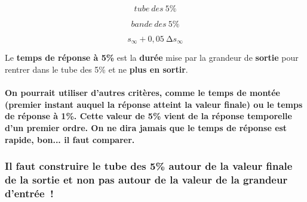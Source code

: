 \[tube\ des\ 5\%\]

\[bande\ des\ 5\%\]

\[s_{\infty} + 0,05\ \mathrm{\Delta}s_{\infty}\]

Le \textbf{temps de réponse à 5\%} est la \textbf{durée} mise par la
grandeur de \textbf{sortie} pour rentrer dans le tube des 5\% et ne
\textbf{plus en sortir}.

\paragraph*{On pourrait utiliser d'autres critères, comme le temps de montée (premier instant auquel la réponse atteint la valeur finale) ou le temps de réponse à 1\%. Cette valeur de 5\% vient de la réponse temporelle d'un premier ordre. On ne dira jamais que le temps de réponse est rapide, bon... il faut comparer. }\label{on-pourrait-utiliser-dautres-crituxe8res-comme-le-temps-de-montuxe9e-premier-instant-auquel-la-ruxe9ponse-atteint-la-valeur-finale-ou-le-temps-de-ruxe9ponse-uxe0-1.-cette-valeur-de-5-vient-de-la-ruxe9ponse-temporelle-dun-premier-ordre.-on-ne-dira-jamais-que-le-temps-de-ruxe9ponse-est-rapide-bon...-il-faut-comparer.}

\subsubsection{ Il faut construire le tube des 5\% autour de la valeur finale de la sortie et non pas autour de la valeur de la grandeur d'entrée~!}\label{il-faut-construire-le-tube-des-5-autour-de-la-valeur-finale-de-la-sortie-et-non-pas-autour-de-la-valeur-de-la-grandeur-dentruxe9e}

\subsubsection*{}\label{section}

